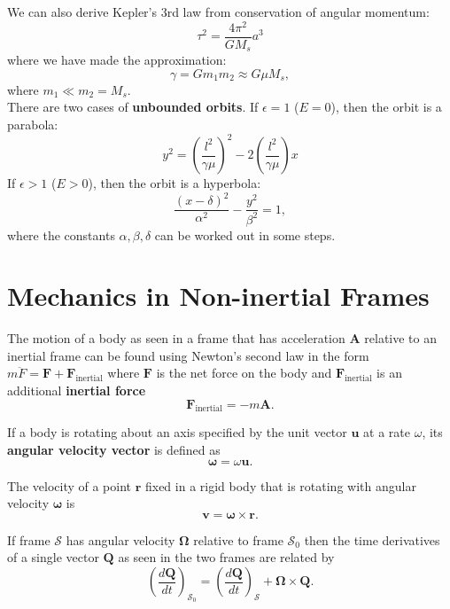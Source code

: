 \documentclass{book}
\theoremstyle{definition}
\newcommand{\al}{\alpha}
\newcommand{\be}{\beta}
\newcommand{\f}[2]{\frac{#1}{#2}}
\newcommand{\lp}{\left(}
\newcommand{\rp}{\right)}
\begin{document}
We can also derive Kepler's 3rd law from conservation of angular momentum:
\begin{equation*}
\tau^2 = \f{4\pi^2}{GM_s}a^3
\end{equation*}
where we have made the approximation:
\begin{equation*}
\gamma = Gm_1m_2 \approx G\mu M_s,
\end{equation*}
where $m_1 \ll m_2 = M_s$.\\



There are two cases of \textbf{unbounded orbits}. If $\epsilon = 1$ ($E=0$), then the orbit is a parabola: 
\begin{equation*}
y^2 = \lp \f{l^2}{\gamma\mu} \rp^2 - 2\lp \f{l^2}{\gamma\mu} \rp x
\end{equation*}
If $\epsilon > 1$ ($E > 0$), then the orbit is a hyperbola:
\begin{equation*}
\f{(x-\delta)^2}{\al^2} - \f{y^2}{\be^2} = 1,
\end{equation*}
where the constants $\al,\be,\delta$ can be worked out in some steps. 


\section{Mechanics in Non-inertial Frames}
The motion of a body as seen in a frame that has acceleration $\mathbf{A}$ relative to an inertial frame can be found using Newton's second law in the form $m\ddot{F} = \mathbf{F} + \mathbf{F}_\text{inertial}$ where $\mathbf{F}$ is the net force on the body and $\mathbf{F}_\text{inertial}$ is an additional \textbf{inertial force}
\begin{equation*}
\textbf{F}_\text{inertial} = - m \mathbf{A}.
\end{equation*}


If a body is rotating about an axis specified by the unit vector $\textbf{u}$ at a rate $\omega$, its \textbf{angular velocity vector} is defined as 
\begin{equation*}
\mathbf{\omega} = \omega \textbf{u}. 
\end{equation*}

The velocity of a point $\textbf{r}$ fixed in a rigid body that is rotating with angular velocity $\mathbf{\omega}$ is 
\begin{equation*}
\textbf{v} = \mathbf{\omega} \times \textbf{r}. 
\end{equation*}


If frame $\mathcal{S}$ has angular velocity $\mathbf{\Omega}$ relative to frame $\mathcal{S}_0$ then the time derivatives of a single vector $\mathbf{Q}$ as seen in the two frames are related by 
\begin{equation*}
\lp \f{d\textbf{Q}}{dt} \rp_{\mathcal{S}_0} = \lp \f{d\textbf{Q}}{dt} \rp_\mathcal{S} + \mathbf{\Omega}\times \textbf{Q}.
\end{equation*}
\end{document}
